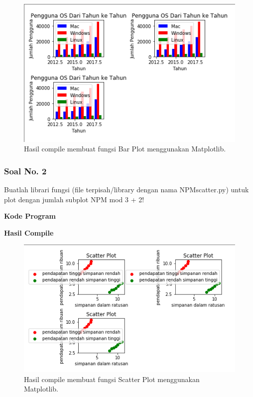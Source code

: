\begin{figure}[H]
	\includegraphics[width=12cm]{figures/6/Praktek/1174039/p1.png}
	\centering
	\caption{Hasil compile membuat fungsi Bar Plot menggunakan Matplotlib.}
\end{figure}

\subsubsection{Soal No. 2}
\hfill \break
Buatlah librari fungsi (file terpisah/library dengan nama NPMscatter.py) untuk plot dengan jumlah subplot NPM mod 3 + 2!

\hfill \break
\textbf{Kode Program}



\hfill \break
\textbf{Hasil Compile}

\begin{figure}[H]
	\includegraphics[width=12cm]{figures/6/Praktek/1174039/p2.png}
	\centering
	\caption{Hasil compile membuat fungsi Scatter Plot menggunakan Matplotlib.}
\end{figure}

